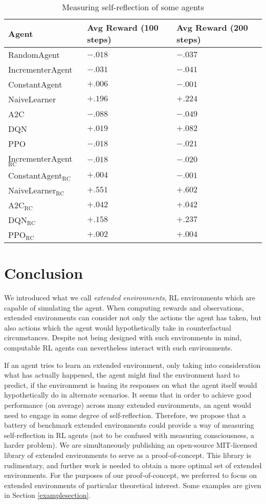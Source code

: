 \documentclass{article}
\def\RC{\textrm{RC}}
\begin{document}
\begin{table}
  \caption{Measuring self-reflection of some agents}
  \label{measurementtable}
  \centering
  \begin{tabular}{lll}
    \toprule
    Agent     & Avg Reward (100 steps)     & Avg Reward (200 steps)\\
    \midrule
    RandomAgent & $-.018$ & $-.037$\\
    IncrementerAgent & $-.031$ & $-.041$\\
    ConstantAgent & $+.006$ & $-.001$\\
    NaiveLearner & $+.196$ & $+.224$\\
    A2C & $-.088$ & $-.049$\\
    DQN & $+.019$ & $+.082$\\
    PPO & $-.018$ & $-.021$\\
    IncrementerAgent${}_{\RC}$ & $-.018$ & $-.020$\\
    ConstantAgent${}_{\RC}$ & $+.004$ & $-.001$\\
    NaiveLearner${}_{\RC}$ & $+.551$ & $+.602$\\
    A2C${}_{\RC}$ & $+.042$ & $+.042$\\
    DQN${}_{\RC}$ & $+.158$ & $+.237$\\
    PPO${}_{\RC}$ & $+.002$ & $+.004$\\
    \bottomrule
  \end{tabular}
\end{table}

\section{Conclusion}

We introduced what we call \emph{extended environments}, RL environments
which are capable of simulating the agent. When computing rewards and observations,
extended environments can consider not only the actions the agent has taken, but also
actions which the agent would hypothetically take in counterfactual circumstances.
Despite not being designed with such environments in mind, computable RL agents
can nevertheless interact with such environments.

If an agent tries to learn an extended environment, only taking into consideration
what has actually happened, the agent might find the environment hard to predict, if the
environment is basing its responses on what the agent itself would hypothetically
do in alternate scenarios. It seems that in order to achieve good performance (on
average) across many extended environments, an agent would need to engage in some degree of
self-reflection. Therefore, we propose that a battery of benchmark extended environments
could provide a way of measuring self-reflection in RL agents (not to be confused
with measuring consciousness, a harder problem). We are simultaneously publishing
an open-source MIT-licensed library \cite{library} of extended environments to serve
as a proof-of-concept. This library is rudimentary, and further work is
needed to obtain a more optimal set of extended environments. For the purposes of our
proof-of-concept, we preferred to focus on extended environments of particular
theoretical interest. Some examples are given in Section \ref{examplesection}.
\end{document}
